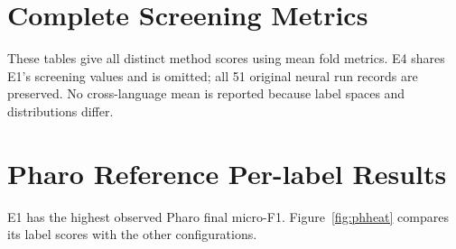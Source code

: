 \section{Complete Screening Metrics}\label{app:metrics}
These tables give all distinct method scores using mean fold metrics. E4 shares E1's screening values and is omitted; all 51 original neural run records are preserved. No cross-language mean is reported because label spaces and distributions differ.
\FloatBarrier
\FloatBarrier
\FloatBarrier
\section{Pharo Reference Per-label Results}

E1 has the highest observed Pharo final micro-F1. Figure~\ref{fig:phheat} compares its label scores with the other configurations.
\FloatBarrier
